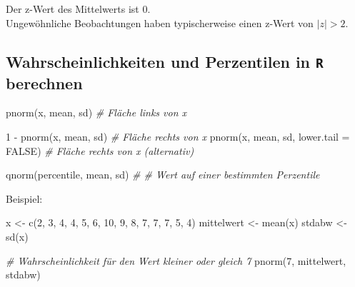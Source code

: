 \documentclass[
]{book}
\newenvironment{Shaded}{\begin{snugshade}}{\end{snugshade}}
\newcommand{\AttributeTok}[1]{\textcolor[rgb]{0.77,0.63,0.00}{#1}}
\newcommand{\CommentTok}[1]{\textcolor[rgb]{0.56,0.35,0.01}{\textit{#1}}}
\newcommand{\ConstantTok}[1]{\textcolor[rgb]{0.00,0.00,0.00}{#1}}
\newcommand{\DecValTok}[1]{\textcolor[rgb]{0.00,0.00,0.81}{#1}}
\newcommand{\FunctionTok}[1]{\textcolor[rgb]{0.00,0.00,0.00}{#1}}
\newcommand{\NormalTok}[1]{#1}
\newcommand{\OtherTok}[1]{\textcolor[rgb]{0.56,0.35,0.01}{#1}}
\newcommand{\SpecialCharTok}[1]{\textcolor[rgb]{0.00,0.00,0.00}{#1}}
\begin{document}
Der z-Wert des Mittelwerts ist 0.\\
Ungewöhnliche Beobachtungen haben typischerweise einen z-Wert von \(|z|>2\).

\hypertarget{wahrscheinlichkeiten-und-perzentilen-in-r-berechnen}{%
\subsection{\texorpdfstring{Wahrscheinlichkeiten und Perzentilen in \texttt{R} berechnen}{Wahrscheinlichkeiten und Perzentilen in R berechnen}}\label{wahrscheinlichkeiten-und-perzentilen-in-r-berechnen}}

\begin{Shaded}
\begin{Highlighting}[]
\FunctionTok{pnorm}\NormalTok{(x, mean, sd)                      }\CommentTok{\# Fläche links von x }

\DecValTok{1} \SpecialCharTok{{-}} \FunctionTok{pnorm}\NormalTok{(x, mean, sd)                  }\CommentTok{\# Fläche rechts von x}
\FunctionTok{pnorm}\NormalTok{(x, mean, sd, }\AttributeTok{lower.tail =} \ConstantTok{FALSE}\NormalTok{)  }\CommentTok{\# Fläche rechts von x (alternativ)}

\FunctionTok{qnorm}\NormalTok{(percentile, mean, sd)             }\CommentTok{\# \# Wert auf einer bestimmten Perzentile}
\end{Highlighting}
\end{Shaded}

Beispiel:

\begin{Shaded}
\begin{Highlighting}[]
\NormalTok{x }\OtherTok{\textless{}{-}} \FunctionTok{c}\NormalTok{(}\DecValTok{2}\NormalTok{, }\DecValTok{3}\NormalTok{, }\DecValTok{4}\NormalTok{, }\DecValTok{4}\NormalTok{, }\DecValTok{5}\NormalTok{, }\DecValTok{6}\NormalTok{, }\DecValTok{10}\NormalTok{, }\DecValTok{9}\NormalTok{, }\DecValTok{8}\NormalTok{, }\DecValTok{7}\NormalTok{, }\DecValTok{7}\NormalTok{, }\DecValTok{7}\NormalTok{, }\DecValTok{5}\NormalTok{, }\DecValTok{4}\NormalTok{)}
\NormalTok{mittelwert }\OtherTok{\textless{}{-}} \FunctionTok{mean}\NormalTok{(x)}
\NormalTok{stdabw }\OtherTok{\textless{}{-}} \FunctionTok{sd}\NormalTok{(x)}

\CommentTok{\# Wahrscheinlichkeit für den Wert kleiner oder gleich 7}
\FunctionTok{pnorm}\NormalTok{(}\DecValTok{7}\NormalTok{, mittelwert, stdabw)}
\end{Highlighting}
\end{Shaded}
\end{document}
